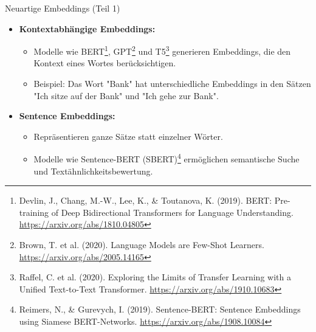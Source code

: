 \documentclass[aspectratio=1610, xcolor=dvipsnames, 9pt]{beamer}
\begin{document}
\begin{frame}{Neuartige Embeddings (Teil 1)}
  \begin{itemize}
    \item \textbf{Kontextabhängige Embeddings:}
      \begin{itemize}
        \item Modelle wie BERT\footnote{Devlin, J., Chang, M.-W., Lee, K., \& Toutanova, K. (2019). BERT: Pre-training of Deep Bidirectional Transformers for Language Understanding. \url{https://arxiv.org/abs/1810.04805}}, GPT\footnote{Brown, T. et al. (2020). Language Models are Few-Shot Learners. \url{https://arxiv.org/abs/2005.14165}} und T5\footnote{Raffel, C. et al. (2020). Exploring the Limits of Transfer Learning with a Unified Text-to-Text Transformer. \url{https://arxiv.org/abs/1910.10683}} generieren Embeddings, die den Kontext eines Wortes berücksichtigen.
        \item Beispiel: Das Wort "Bank" hat unterschiedliche Embeddings in den Sätzen "Ich sitze auf der Bank" und "Ich gehe zur Bank".
      \end{itemize}
    \vspace{0.5cm}
    \item \textbf{Sentence Embeddings:}
      \begin{itemize}
        \item Repräsentieren ganze Sätze statt einzelner Wörter.
        \item Modelle wie Sentence-BERT (SBERT)\footnote{Reimers, N., \& Gurevych, I. (2019). Sentence-BERT: Sentence Embeddings using Siamese BERT-Networks. \url{https://arxiv.org/abs/1908.10084}} ermöglichen semantische Suche und Textähnlichkeitsbewertung.
      \end{itemize}
  \end{itemize}
\end{frame}
\end{document}
